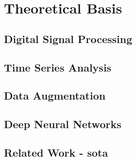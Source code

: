 


\chapter{Theoretical Basis}
\label{chap:basis}

\section{Digital Signal Processing}
\label{sec:signal}


\section{Time Series Analysis}
\label{sec:time-series}

\section{Data Augmentation}
\label{sec:data-augmentation}

\section{Deep Neural Networks}
\label{sec:nn}

\section{Related Work - \acrfull{sota}}  %
\label{sec:realted-work}

